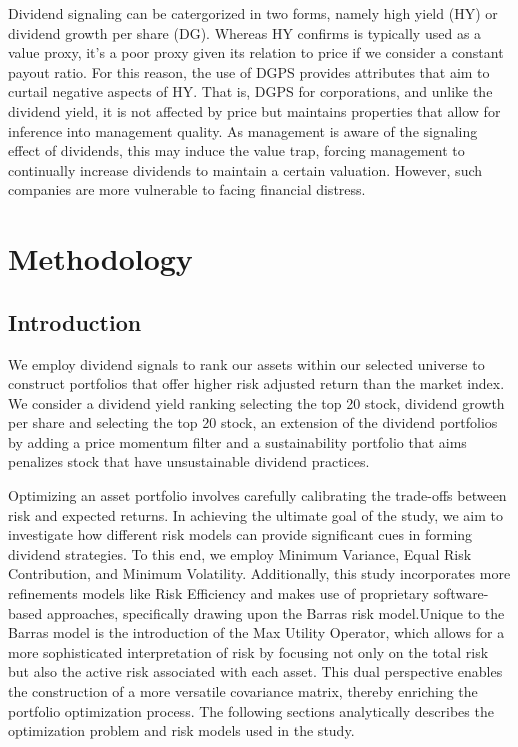 \documentclass[11pt,preprint, authoryear]{elsarticle}
\numberwithin{equation}{section}
\numberwithin{figure}{section}
\numberwithin{table}{section}
\begin{document}
Dividend signaling can be catergorized in two forms, namely high yield
(HY) or dividend growth per share (DG). Whereas HY confirms is typically
used as a value proxy, it's a poor proxy given its relation to price if
we consider a constant payout ratio. For this reason, the use of DGPS
provides attributes that aim to curtail negative aspects of HY. That is,
DGPS for corporations, and unlike the dividend yield, it is not affected
by price but maintains properties that allow for inference into
management quality. As management is aware of the signaling effect of
dividends, this may induce the value trap, forcing management to
continually increase dividends to maintain a certain valuation. However,
such companies are more vulnerable to facing financial distress.

\newpage

\hypertarget{methodology}{%
\section{Methodology}\label{methodology}}

\hypertarget{introduction-1}{%
\subsection{Introduction}\label{introduction-1}}

We employ dividend signals to rank our assets within our selected
universe to construct portfolios that offer higher risk adjusted return
than the market index. We consider a dividend yield ranking selecting
the top 20 stock, dividend growth per share and selecting the top 20
stock, an extension of the dividend portfolios by adding a price
momentum filter and a sustainability portfolio that aims penalizes stock
that have unsustainable dividend practices.

Optimizing an asset portfolio involves carefully calibrating the
trade-offs between risk and expected returns. In achieving the ultimate
goal of the study, we aim to investigate how different risk models can
provide significant cues in forming dividend strategies. To this end, we
employ Minimum Variance, Equal Risk Contribution, and Minimum
Volatility. Additionally, this study incorporates more refinements
models like Risk Efficiency and makes use of proprietary software-based
approaches, specifically drawing upon the Barras risk model.Unique to
the Barras model is the introduction of the Max Utility Operator, which
allows for a more sophisticated interpretation of risk by focusing not
only on the total risk but also the active risk associated with each
asset. This dual perspective enables the construction of a more
versatile covariance matrix, thereby enriching the portfolio
optimization process. The following sections analytically describes the
optimization problem and risk models used in the study.
\end{document}
